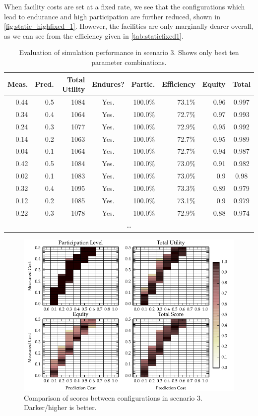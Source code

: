 When facility costs are set at a fixed rate, we see that the configurations
which lead to endurance and high participation are further reduced, shown in
\autoref{fig:static_highfixed_1}. However, the facilities are only marginally
dearer overall, as we can see from the efficiency given in
\autoref{tab:staticfixed1}.

\begin{table}
\centering
\caption{Evaluation of simulation performance in scenario 3. Shows only best ten parameter combinations.}\label{tab:staticfixed1}
\begin{tabular}{r|r||r|c|r|r|r||c}
Meas. & Pred. & Total Utility & Endures? & Partic. & Efficiency & Equity & Total \\
\hline
0.44 & 0.5 & 1084 & Yes. & 100.0\% & 73.1\% & 0.96 & 0.997 \\
0.34 & 0.4 & 1064 & Yes. & 100.0\% & 72.7\% & 0.97 & 0.993 \\
0.24 & 0.3 & 1077 & Yes. & 100.0\% & 72.9\% & 0.95 & 0.992 \\
0.14 & 0.2 & 1063 & Yes. & 100.0\% & 72.7\% & 0.95 & 0.989 \\
0.04 & 0.1 & 1064 & Yes. & 100.0\% & 72.7\% & 0.94 & 0.987 \\
0.42 & 0.5 & 1084 & Yes. & 100.0\% & 73.0\% & 0.91 & 0.982 \\
0.02 & 0.1 & 1083 & Yes. & 100.0\% & 73.0\% & 0.9 & 0.98 \\
0.32 & 0.4 & 1095 & Yes. & 100.0\% & 73.3\% & 0.89 & 0.979 \\
0.12 & 0.2 & 1085 & Yes. & 100.0\% & 73.1\% & 0.9 & 0.979 \\
0.22 & 0.3 & 1078 & Yes. & 100.0\% & 72.9\% & 0.88 & 0.974 \\
\multicolumn{8}{c}{\ldots} \\
\end{tabular}
\end{table}

\begin{figure}
\includegraphics{gfx/kc/static_highfixed_1.pdf} 
\caption[Comparison of scores between configurations in scenario 3.]{Comparison of scores between configurations in scenario 3. Darker/higher is better.}\label{fig:static_highfixed_1}
\end{figure}

